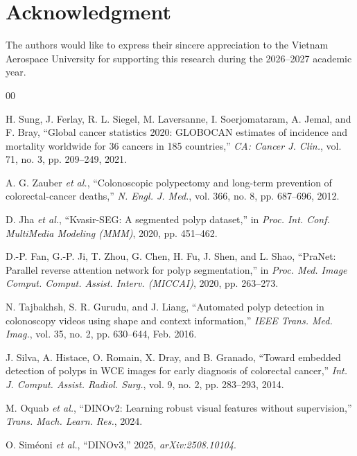 \documentclass{ieeeaccess}
\begin{document}
\section*{Acknowledgment}
The authors would like to express their sincere appreciation to the Vietnam Aerospace University for supporting this research during the 2026--2027 academic year.

\begin{thebibliography}{00}

 H. Sung, J. Ferlay, R. L. Siegel, M. Laversanne, I. Soerjomataram, A. Jemal, and F. Bray, ``Global cancer statistics 2020: GLOBOCAN estimates of incidence and mortality worldwide for 36 cancers in 185 countries,'' \emph{CA: Cancer J. Clin.}, vol. 71, no. 3, pp. 209--249, 2021.


 A. G. Zauber \emph{et al.}, ``Colonoscopic polypectomy and long-term prevention of colorectal-cancer deaths,'' \emph{N. Engl. J. Med.}, vol. 366, no. 8, pp. 687--696, 2012.


 D. Jha \emph{et al.}, ``Kvasir-SEG: A segmented polyp dataset,'' in \emph{Proc. Int. Conf. MultiMedia Modeling (MMM)}, 2020, pp. 451--462.


 D.-P. Fan, G.-P. Ji, T. Zhou, G. Chen, H. Fu, J. Shen, and L. Shao, ``PraNet: Parallel reverse attention network for polyp segmentation,'' in \emph{Proc. Med. Image Comput. Comput. Assist. Interv. (MICCAI)}, 2020, pp. 263--273.


 N. Tajbakhsh, S. R. Gurudu, and J. Liang, ``Automated polyp detection in colonoscopy videos using shape and context information,'' \emph{IEEE Trans. Med. Imag.}, vol. 35, no. 2, pp. 630--644, Feb. 2016.


 J. Silva, A. Histace, O. Romain, X. Dray, and B. Granado, ``Toward embedded detection of polyps in WCE images for early diagnosis of colorectal cancer,'' \emph{Int. J. Comput. Assist. Radiol. Surg.}, vol. 9, no. 2, pp. 283--293, 2014.


 M. Oquab \emph{et al.}, ``DINOv2: Learning robust visual features without supervision,'' \emph{Trans. Mach. Learn. Res.}, 2024.


 O. Sim\'{e}oni \emph{et al.}, ``DINOv3,'' 2025, \emph{arXiv:2508.10104}.



\end{thebibliography}
\end{document}
